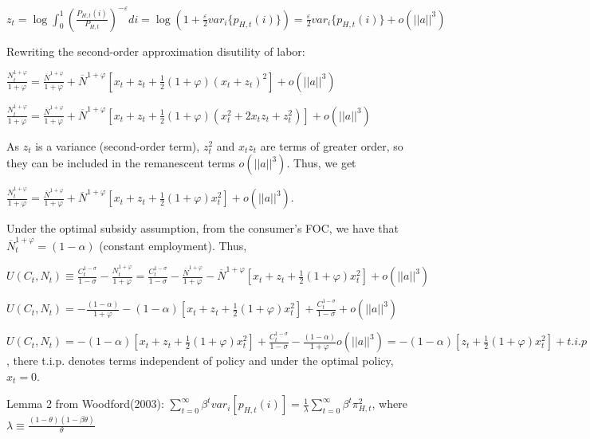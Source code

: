 \documentclass[
]{article}
\begin{document}
\(\displaystyle z_t= \log \int_0^1 \left(\frac{P_{H,t}(i)}{P_{H,t}} \right)^{-\varepsilon} di = \log \left( 1+\frac{\varepsilon}{2}var_i\{p_{H,t}(i)\} \right)= \frac{\varepsilon}{2}var_i\{p_{H,t}(i)\} +o(||a||^3)\)

Rewriting the second-order approximation disutility of labor:

\(\displaystyle \frac{N_t^{1+\varphi}}{1+\varphi} = \frac{\overline{N}^{1+\varphi}}{1+\varphi} +\overline{N}^{1+\varphi}\left[ x_t+z_t + \frac{1}{2}(1+\varphi)(x_t+z_t)^2 \right] + o(||a||^3)\)

\(\displaystyle \frac{N_t^{1+\varphi}}{1+\varphi} = \frac{\overline{N}^{1+\varphi}}{1+\varphi} +\overline{N}^{1+\varphi}\left[ x_t+z_t + \frac{1}{2}(1+\varphi)(x_t^2+2 x_tz_t + z_t^2) \right] + o(||a||^3)\)

As \(z_t\) is a variance (second-order term), \(z_t^2\) and \(x_t z_t\)
are terms of greater order, so they can be included in the remanescent
terms \(o(||a||^3)\). Thus, we get

\(\displaystyle \frac{N_t^{1+\varphi}}{1+\varphi} = \frac{\overline{N}^{1+\varphi}}{1+\varphi} +\overline{N}^{1+\varphi}\left[ x_t+z_t + \frac{1}{2}(1+\varphi)x_t^2 \right] + o(||a||^3)\).

Under the optimal subsidy assumption, from the consumer's FOC, we have
that \(\overline{N}_t^{1+\varphi}=(1-\alpha)\) (constant employment).
Thus,

\(\displaystyle U(C_t,N_t)\equiv \frac{C_t^{1-\sigma}}{1-\sigma}-\frac{N_t^{1+\varphi}}{1+\varphi}= \frac{C_t^{1-\sigma}}{1-\sigma}- \frac{\overline{N}^{1+\varphi}}{1+\varphi} -\overline{N}^{1+\varphi}\left[ x_t+z_t + \frac{1}{2}(1+\varphi)x_t^2 \right] + o(||a||^3)\)

\(\displaystyle U(C_t,N_t) = - \frac{(1-\alpha)}{1+\varphi}-(1-\alpha)\left[ x_t+z_t + \frac{1}{2}(1+\varphi)x_t^2 \right] + \frac{C_t^{1-\sigma}}{1-\sigma}+ o(||a||^3)\)

\(\displaystyle U(C_t,N_t) = -(1-\alpha)\left[ x_t+z_t + \frac{1}{2}(1+\varphi)x_t^2 \right] + \frac{C_t^{1-\sigma}}{1-\sigma}- \frac{(1-\alpha)}{1+\varphi} o(||a||^3)= -(1-\alpha)\left[ z_t + \frac{1}{2}(1+\varphi)x_t^2 \right] + t.i.p+ o(||a||^3)\),
there t.i.p. denotes terms independent of policy and under the optimal
policy, \(x_t=0\).

Lemma 2 from Woodford(2003):
\(\displaystyle \sum_{t=0}^\infty \beta^t var_i[p_{H,t}(i)]= \frac{1}{\lambda} \sum_{t=0}^\infty \beta^t \pi_{H,t}^2\),
where
\(\displaystyle \lambda \equiv \frac{(1-\theta)(1-\beta \theta)}{\theta}\)
\end{document}

